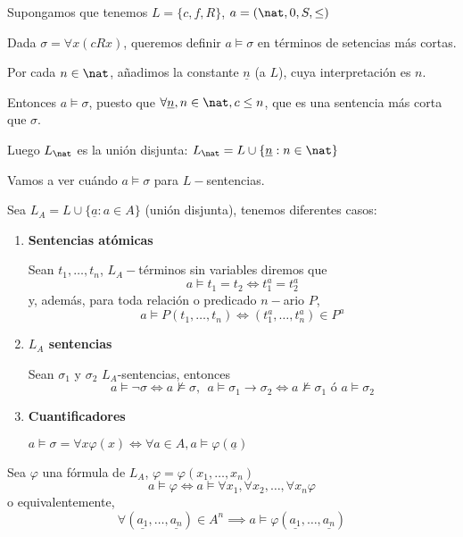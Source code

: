 \begin{example}
Supongamos que tenemos $L = \{c, f, R\}$,  $a = (\nat, 0,S, \leq)$

Dada $\sigma =\forall x(cR x)$, queremos definir $a\vDash \sigma$ en términos de setencias más cortas.

Por cada $n\in \nat$, añadimos la constante $\underline{n}$ (a $L$), cuya interpretación es $n$.

Entonces $a\vDash \sigma$, puesto que $\forall \underline{n}, n\in \nat, c\le n$, que es una sentencia más corta que $\sigma$.

Luego $L_\nat$ es la unión disjunta:
$L_{\nat} = L\cup \{\underline{n}: n\in \nat\}$
\end{example}

\begin{defn}
	Vamos a ver cuándo $a\vDash \sigma$ para $L-$sentencias.

	Sea $L_A = L\cup \{\underline{a}: a \in A\}$ (unión disjunta), tenemos diferentes casos:
	\begin{enumerate}
		\item \textbf{Sentencias atómicas}

		Sean $t_1,\hdots,t_n$, $L_A-$términos sin variables diremos que 
		\[a\vDash t_1=t_2 \iff t_1^a=t_2^a\]
		y, además, para toda relación o predicado $n-$ario $P$, 
		\[a\vDash P(t_1,\hdots,t_n)\iff (t_1^a,\hdots,t_n^a)\in P^a\]

		\item \textbf{$L_A$ sentencias}

		Sean $\sigma_1$ y $\sigma_2$ $L_A$-sentencias, entonces 
		\[a\vDash \neg \sigma \iff a\nvDash \sigma, \ \ a\vDash \sigma_1\rightarrow \sigma_2\iff a\nvDash\sigma_1 \text{ ó } a\vDash\sigma_2\]

		\item \textbf{Cuantificadores}

		$a\vDash \sigma = \forall x\varphi(x)\iff \forall a \in A, a\vDash \varphi(\underline{a})$
	\end{enumerate}
\end{defn}

\begin{prop}
	Sea $\varphi$ una fórmula de $L_A$, $\varphi = \varphi(x_1,\hdots,x_n)$ 
	\[a\vDash \varphi \iff a\vDash \forall x_1,\forall x_2, \hdots, \forall x_n \varphi\]
	o equivalentemente, 
	\[\forall (\underline{a_1}, \hdots, \underline{a_n})\in A^n \implies a\vDash \varphi(\underline{a_1}, \hdots, \underline{a_n})\]
\end{prop}


